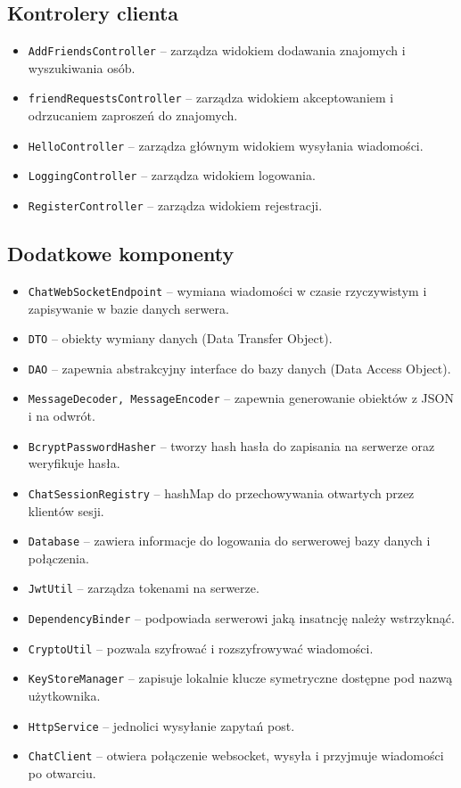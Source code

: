 \documentclass[a4paper,12pt]{article}
\begin{document}
\subsection*{Kontrolery clienta}
\begin{itemize}
    \item \texttt{AddFriendsController} – zarządza widokiem dodawania znajomych i wyszukiwania osób.
    \item \texttt{friendRequestsController} – zarządza widokiem akceptowaniem i odrzucaniem zaproszeń do znajomych.
    \item \texttt{HelloController} – zarządza głównym widokiem wysyłania wiadomości.
    \item \texttt{LoggingController} – zarządza widokiem logowania.
    \item \texttt{RegisterController} – zarządza widokiem rejestracji.
\end{itemize}

\subsection*{Dodatkowe komponenty}
\begin{itemize}
    \item \texttt{ChatWebSocketEndpoint} – wymiana wiadomości w czasie rzyczywistym i zapisywanie w bazie danych serwera.
    \item \texttt{DTO} – obiekty wymiany danych (Data Transfer Object).
    \item \texttt{DAO} – zapewnia abstrakcyjny interface do bazy danych (Data Access Object).
    \item \texttt{MessageDecoder, MessageEncoder} – zapewnia generowanie obiektów z JSON i na odwrót.
    \item \texttt{BcryptPasswordHasher} – tworzy hash hasła do zapisania na serwerze oraz weryfikuje hasła.
    \item \texttt{ChatSessionRegistry} – hashMap do przechowywania otwartych przez klientów sesji.
    \item \texttt{Database} – zawiera informacje do logowania do serwerowej bazy danych i połączenia.
    \item \texttt{JwtUtil} – zarządza tokenami na serwerze.
    \item \texttt{DependencyBinder} – podpowiada serwerowi jaką insatncję należy wstrzyknąć.
    \item \texttt{CryptoUtil} – pozwala szyfrować i rozszyfrowywać wiadomości.
    \item \texttt{KeyStoreManager} – zapisuje lokalnie klucze symetryczne dostępne pod nazwą użytkownika.
    \item \texttt{HttpService} – jednolici wysyłanie zapytań post.
    \item \texttt{ChatClient} – otwiera połączenie websocket, wysyła i przyjmuje wiadomości po otwarciu.
\end{itemize}
\end{document}
